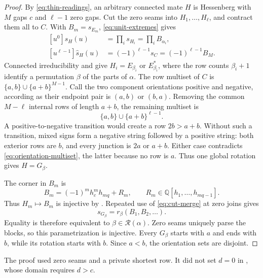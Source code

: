 \documentclass[11pt,a4paper]{amsart}
\numberwithin{equation}{section}
\theoremstyle{plain}
\theoremstyle{definition}
\begin{document}
\begin{proof}
By \eqref{eq:thin-readings}, an arbitrary connected mate \(H\)
is Hessenberg with \(M\) gaps \(c\) and \(\ell-1\) zero gaps.
Cut the zero seams into \(H_1,\ldots,H_\ell\), and contract them
all to \(C\).  With \(B_m=s_{E_m}\), \eqref{eq:unit-extremes} gives
\[
 \begin{aligned}
 [u^0]\widehat s_H(u)&=\prod_i s_{H_i}
                     =\prod_i B_{\alpha_i},\\
 [u^{\ell-1}]\widehat s_H(u)&=(-1)^{\ell-1}s_C
                     =(-1)^{\ell-1}B_M.
 \end{aligned}
\]
Connected irreducibility and  give
\(H_i=E_{\beta_i}\) or \(E_{\beta_i}^*\), where the row counts
\(\beta_i+1\) identify a permutation \(\beta\) of the parts of
\(\alpha\).  The row multiset of \(C\) is
\(\{a,b\}\cup\{a+b\}^{M-1}\).
Call the two component orientations positive and negative, according
as their endpoint pair is \((a,b)\) or \((b,a)\).  Removing the common
\(M-\ell\) internal rows of length \(a+b\), the remaining multiset is
\begin{equation}\label{eq:orientation-multiset}
 \{a,b\}\cup\{a+b\}^{\ell-1}.
\end{equation}
A positive-to-negative transition would create a row \(2b>a+b\).
Without such a transition, mixed signs form a negative string followed
by a positive string: both exterior rows are \(b\), and every junction
is \(2a\) or \(a+b\).  Either case contradicts
\eqref{eq:orientation-multiset}, the latter because no row is \(a\).
Thus one global rotation gives \(H=G_\beta\).

The corner in \(B_m\) is
\[
 B_m=(-1)^m h_c^m h_{mq}+R_m,\qquad
 R_m\in\mathbb Q[h_1,\ldots,h_{mq-1}].
\]
Thus \(H_m\mapsto B_m\) is injective by
.  Repeated use of
\eqref{eq:cut-merge} at zero joins gives
\begin{equation}\label{eq:thin-substitution}
 s_{G_\beta}=r_\beta(B_1,B_2,\ldots).
\end{equation}
Equality is therefore equivalent to \(\beta\in\mathcal R(\alpha)\).
Zero seams uniquely parse the blocks, so this parametrization is
injective.  Every \(G_\beta\) starts with \(a\) and ends with
\(b\), while its rotation starts with \(b\).  Since \(a<b\), the
orientation sets are disjoint.
\end{proof}

The proof used zero seams and a private shortest row.  It did not set
\(d=0\) in , whose domain requires
\(d>c\).
\end{document}
